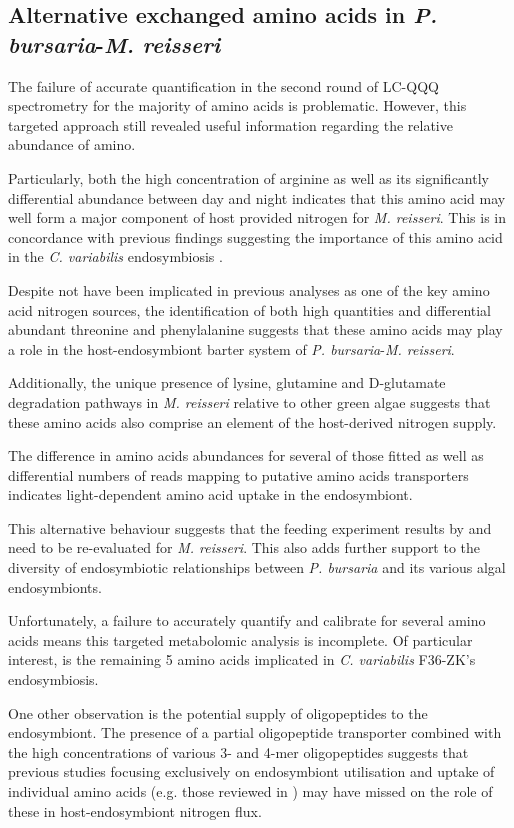 \subsection{Alternative exchanged amino acids in \textit{P. bursaria}-\textit{M. reisseri}}

The failure of accurate quantification in the second round
of LC-QQQ spectrometry for the majority of amino acids 
is problematic.  However, this targeted approach still revealed
useful information regarding the relative abundance of amino.

Particularly, both the high concentration of arginine as well
as its significantly differential abundance between day and night
indicates that this amino acid may well form a major component of 
host provided nitrogen for \textit{M. reisseri}. This is in
concordance with previous findings suggesting 
the importance of this amino acid in the \textit{C. variabilis}
endosymbiosis \citep{Kato2006}.

Despite not have been implicated in previous analyses
as one of the key amino acid nitrogen sources, the identification
of both high quantities and differential abundant 
threonine and phenylalanine suggests that these
amino acids may play a role in the host-endosymbiont
barter system of \textit{P. bursaria}-\textit{M. reisseri}.

Additionally, the unique presence of lysine, glutamine and D-glutamate 
degradation pathways in \textit{M. reisseri} relative to other green algae
suggests that these amino acids also comprise an element of the host-derived
nitrogen supply.

The difference in amino acids abundances for several of those fitted
as well as differential numbers of reads mapping to putative amino 
acids transporters indicates light-dependent amino acid uptake
in the endosymbiont. 

This alternative behaviour suggests that the feeding experiment
results by \citep{Kato2006} and \citep{Kato2009a} need 
to be re-evaluated for \textit{M. reisseri}. This also
adds further support to the diversity of endosymbiotic
relationships between \textit{P. bursaria} and its
various algal endosymbionts. 

Unfortunately, a failure to accurately quantify and calibrate
for several amino acids means this targeted metabolomic analysis
is incomplete.  Of particular interest, is the remaining 5 amino acids
implicated in \textit{C. variabilis} F36-ZK's endosymbiosis.


One other observation is the potential supply of oligopeptides to the endosymbiont.
The presence of a partial oligopeptide transporter 
combined with the high concentrations of various 3- and 4-mer oligopeptides
suggests that previous studies focusing exclusively on endosymbiont utilisation
and uptake of individual amino acids (e.g. those reviewed in \citep{Kato2009a}) 
may have missed on the role of these in host-endosymbiont nitrogen flux.


